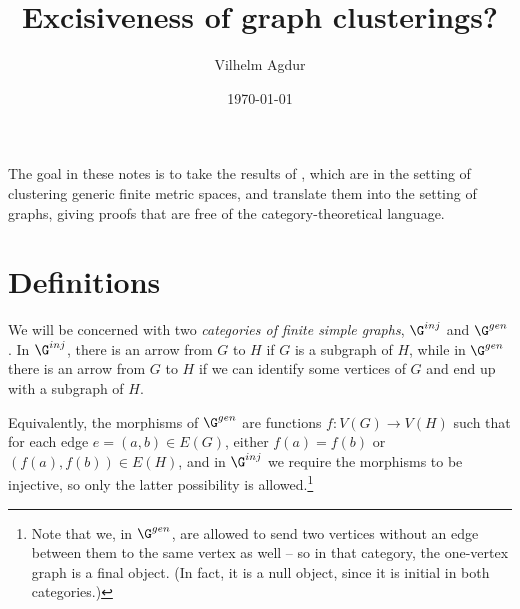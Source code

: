 \documentclass[a4paper,reqno,oneside]{article} %
\begin{document}

\title{Excisiveness of graph clusterings?}
\author{Vilhelm Agdur}
\date{\today}
\maketitle

The goal in these notes is to take the results of \cite{carlsson_mémoli_2013}, which are in the setting of clustering generic finite metric spaces, and translate them into the setting of graphs, giving proofs that are free of the category-theoretical language.

\section{Definitions}

\begin{definition}
We will be concerned with two \emph{categories of finite simple graphs}, $\G^{inj}$ and $\G^{gen}$. In $\G^{inj}$, there is an arrow from $G$ to $H$ if $G$ is a subgraph of $H$, while in $\G^{gen}$ there is an arrow from $G$ to $H$ if we can identify some vertices of $G$ and end up with a subgraph of $H$.

Equivalently, the morphisms of $\G^{gen}$ are functions $f: V(G) \to V(H)$ such that for each edge $e = (a,b) \in E(G)$, either $f(a) = f(b)$ or $(f(a), f(b)) \in E(H)$, and in $\G^{inj}$ we require the morphisms to be injective, so only the latter possibility is allowed.\footnote{Note that we, in $\G^{gen}$, are allowed to send two vertices without an edge between them to the same vertex as well -- so in that category, the one-vertex graph is a final object. (In fact, it is a null object, since it is initial in both categories.)}
\end{definition}
\end{document}
